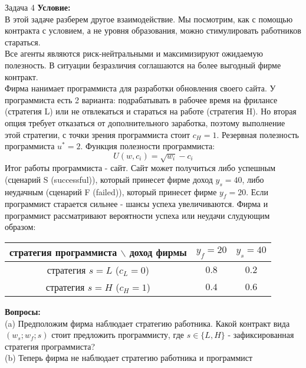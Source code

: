\begin{mybox}{Задача 4}
    \indent\setlength{\parindent}{1em}\textbf{Условие:}\\
    \indent\setlength{\parindent}{1em}В этой задаче разберем другое взаимодействие. Мы посмотрим, как с помощью контракта с условием, а не уровня
    образования, можно стимулировать работников стараться.\\
    \indent\setlength{\parindent}{1em}Все агенты являются риск-нейтральными и максимизируют ожидаемую полезность. В ситуации безразличия соглашаются на
    более выгодный фирме контракт.\\
    \indent\setlength{\parindent}{1em}Фирма нанимает программиста для разработки обновления своего сайта. У
    программиста есть 2 варианта: подрабатывать в
    рабочее время на фрилансе (стратегия L) или не отвлекаться и стараться на работе (стратегия H). Но вторая опция
    требует отказаться от дополнительного заработка, поэтому выполнение этой стратегии, с точки зрения программиста
    стоит $c_H=1$. Резервная полезность программиста $u^*=2$. Функция полезности программиста: $$U(w,c_i)=\sqrt{w_i}
    -c_i$$
    \indent\setlength{\parindent}{1em}Итог работы программиста - сайт. Сайт может получиться либо успешным (сценарий S (successful)), который принесет
    фирме доход $y_s=40$, либо неудачным (сценарий F (failed)), который принесет фирме $y_f=20$. Если программист
    старается сильнее - шансы успеха увеличиваются. Фирма и программист рассматривают вероятности успеха или неудачи слудующим образом:
    \\\begin{center}
    \begin{tabular}{ c|c|c }
     стратегия программиста $\backslash$ доход фирмы & $y_f=20$ & $y_s=40$ \\
     \hline
     стратегия $s=L$ ($c_L=0$) & $0.8$ & $0.2$ \\
     \hline
     стратегия $s=H$ ($c_H=1$) & $0.4$ & $0.6$ \\
    \end{tabular}
    \end{center}
    \indent\setlength{\parindent}{1em}\textbf{Вопросы:}\\
    \indent\setlength{\parindent}{1em}(a) Предположим фирма наблюдает стратегию работника. Какой
    контракт вида $(w_s;w_f;s)$ стоит предложить программисту, где $s\in\{L,H\}$ - зафиксированная стратегия
    программиста?\\
    \indent\setlength{\parindent}{1em}(b) Теперь фирма не наблюдает стратегию работника и программист

\end{mybox}
